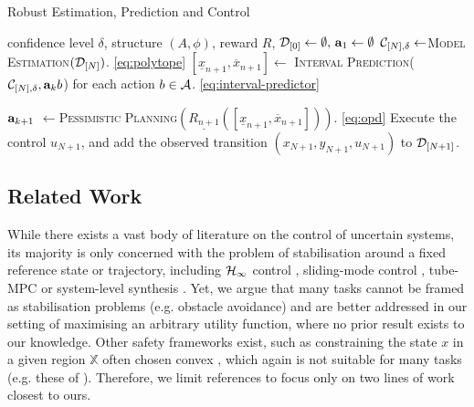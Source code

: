 \documentclass{article}
\begin{document}
\begin{algorithm}[tb]
	\caption{Robust Estimation, Prediction and Control}
	\label{alg:full}
	\begin{algorithmic}
		 confidence level $\delta$, structure $(A,\phi)$, reward $R$, $\mathcal{D}_{[0]}\gets\emptyset,\, \mathbf{a}_1\gets\emptyset$
		\STATE $\mathcal{C}_{[N],\delta} \gets$\textsc{Model Estimation}$(\mathcal{D}_{[N]})$. \eqref{eq:polytope}
		\STATE $[\underline{x}_{n+1}, \overline{x}_{n+1}]\gets$ \textsc{Interval Prediction}($\mathcal{C}_{[N],\delta}, \mathbf{a}_kb$) for each action $b\in \mathcal{A}$. \eqref{eq:interval-predictor}

		\STATE $\mathbf{a}_{k+1}$ $\gets$\textsc{Pessimistic Planning}$(\underline{R_{n+1}}([\underline{x}_{n+1}, \overline{x}_{n+1}]))$.  \eqref{eq:opd}
		\ENDFOR
		\STATE Execute the control $u_{N+1}$, and add the observed transition $(x_{N+1}, y_{N+1}, u_{N+1})$ to $\mathcal{D}_{[N+1]}$.
		\ENDFOR
	\end{algorithmic}
\end{algorithm}

\subsection{Related Work}

While there exists a vast body of literature on the control of uncertain systems, its majority is only concerned with the problem of stabilisation around a fixed reference state or trajectory, including $\mathcal{H}_\infty$ control \citep[see, e.g.][]{Basar1996}, sliding-mode control \citep{Lu1997}, tube-MPC \citep{Limon2010} or system-level synthesis \citep{Dean2017,Dean2018}. Yet, we argue that many tasks cannot be framed as stabilisation problems (e.g. obstacle avoidance) and are better addressed in our setting of maximising an arbitrary utility function, where no prior result exists to our knowledge. Other safety frameworks exist, such as constraining the state $x$ in a given region $\mathbb{X}$ often chosen convex \citep[e.g.][]{Turchetta2016}, which again is not suitable for many tasks (e.g. these of ). Therefore, we limit references to focus only on two lines of work closest to ours.
\end{document}
